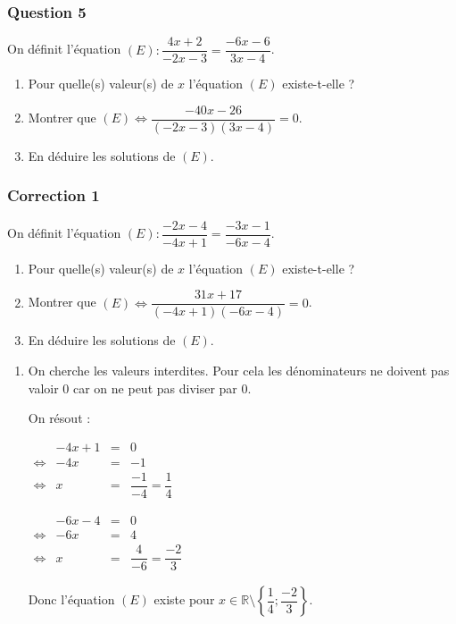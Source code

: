 \documentclass[15pt, mathserif]{beamer}
\newcommand{\R}{\mathbb{R}}			%
\begin{document}
\begin{frame} 
	\frametitle{Question 5}
On définit l'équation $(E):\dfrac{4x+2}{-2x-3}=\dfrac{-6x-6}{3x-4}$. 
 \begin{enumerate} 
 	 \item Pour quelle(s) valeur(s) de $x$ l'équation $(E)$ existe-t-elle ? 
 	 \item Montrer que $(E) \Leftrightarrow \dfrac{-40x-26}{(-2x-3)(3x-4)}=0$. 
 	 \item En déduire les solutions de $(E)$. 
 \end{enumerate}\end{frame}


\begin{frame}
\vspace{-10mm}
	\frametitle{Correction 1}
 \vspace*{1cm} 
 
 On définit l'équation $(E):\dfrac{-2x-4}{-4x+1}=\dfrac{-3x-1}{-6x-4}$. 
 \begin{enumerate} 
 	 \item Pour quelle(s) valeur(s) de $x$ l'équation $(E)$ existe-t-elle ? 
 	 \item Montrer que $(E) \Leftrightarrow \dfrac{31x+17}{(-4x+1)(-6x-4)}=0$. 
 	 \item En déduire les solutions de $(E)$. 
 \end{enumerate} 
 
 \begin{enumerate} 
 	 \item On cherche les valeurs interdites. Pour cela les dénominateurs ne doivent pas valoir 0 car on ne peut pas diviser par 0. 
 
 	 On résout : 
 
  \begin{minipage}{0.45\linewidth} 
 	 $\begin{array}{crcl} 
 	 	 & -4x+1& = & 0 \\ 
 	 	 	 \Leftrightarrow &-4x & = &-1\\ 
 	 	 	 \Leftrightarrow & x & = & \dfrac{-1}{-4}=\dfrac{1}{4}
 	 	 \end{array} $ 
 	 \end{minipage} \hfil \begin{minipage}{0.45\linewidth} 
 	 $\begin{array}{crcl} 
 	 	 & -6x-4& = & 0 \\ 
 	 	 	 \Leftrightarrow &-6x & = &4 \\ 
 	 	 	 \Leftrightarrow & x & = & \dfrac{4}{-6}=\dfrac{-2}{3}
 	 	 \end{array} $ 
 
 	 \end{minipage} 
 
 Donc l'équation $(E)$ existe pour $x \in \R \setminus \left\{\dfrac{1}{4};\dfrac{-2}{3}\right\}$. 
 \end{enumerate} 
 \end{frame} 
\end{document}
